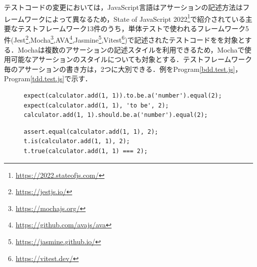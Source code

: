 \documentclass[submit]{ipsj}
\begin{document}
テストコードの変更においては，JavaScript言語はアサーションの記述方法はフレームワークによって異なるため，State of JavaScript 2022\footnote{\url{https://2022.stateofjs.com/}}で紹介されている主要なテストフレームワーク13件のうち，単体テストで使われるフレームワーク5件(Jest\footnote{\url{https://jestjs.io/}},Mocha\footnote{\url{https://mochajs.org/}},AVA\footnote{\url{https://github.com/avajs/ava}},Jasmine\footnote{\url{https://jasmine.github.io/}},Vitest\footnote{\url{https://vitest.dev/}})で記述されたテストコードをを対象とする．Mochaは複数のアサーションの記述スタイルを利用できるため，Mochaで使用可能なアサーションのスタイルについても対象とする．テストフレームワーク毎のアサーションの書き方は，2つに大別できる．例をProgram\ref{bdd.test.js}，Program\ref{tdd.test.js}で示す．


\begin{figure}[t]
\begin{lstlisting}[caption=アサーション例1, label=bdd.test.js]
expect(calculator.add(1, 1)).to.be.a('number').equal(2);
expect(calculator.add(1, 1), 'to be', 2);
calculator.add(1, 1).should.be.a('number').equal(2);
\end{lstlisting}

\vspace{-3mm}

\begin{lstlisting}[caption=アサーション例2, label=tdd.test.js]
assert.equal(calculator.add(1, 1), 2);
t.is(calculator.add(1, 1), 2);  
t.true(calculator.add(1, 1) === 2);
\end{lstlisting}
\vspace{-3mm}
\end{figure}
\end{document}

